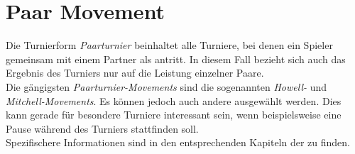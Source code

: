 \section{Paar Movement}\label{pair movement}

\noindent
Die Turnierform \textit{Paarturnier} beinhaltet alle Turniere, bei denen ein Spieler
gemeinsam mit einem Partner als \pa antritt. In diesem Fall bezieht sich
auch das Ergebnis des Turniers nur auf die Leistung einzelner Paare.\\[.2cm]

\noindent
Die gängigsten \textit{Paarturnier-Movements} sind die sogenannten \textit{Howell-} und
\textit{Mitchell-Movements}. Es können jedoch auch andere \bms ausgewählt werden.
Dies kann gerade für besondere Turniere interessant sein, wenn beispielsweise eine
Pause während des Turniers stattfinden soll.\\[.2cm]

\noindent
Spezifischere Informationen sind in den entsprechenden Kapiteln der \bms zu finden.

